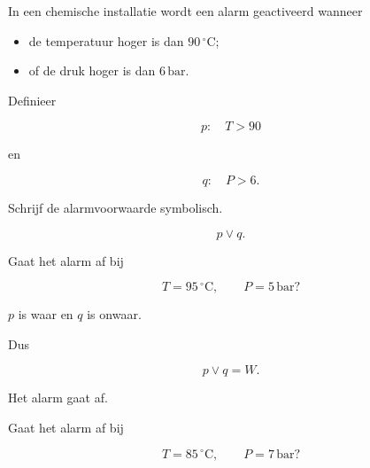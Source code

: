 \documentclass{ximera}
\begin{document}
\begin{oefening}{\oefU \ESS}

In een chemische installatie wordt een alarm geactiveerd wanneer

\begin{itemize}

  \item de temperatuur hoger is dan $90\,{}^\circ\mathrm C$;

  \item of de druk hoger is dan $6\,\mathrm{bar}$.

\end{itemize}

Definieer

\[
p:\quad T>90
\]

en

\[
q:\quad P>6.
\]

\begin{question}

Schrijf de alarmvoorwaarde symbolisch.

\begin{oplossing}

\[
p\lor q.
\]

\end{oplossing}

\end{question}



\begin{question}

Gaat het alarm af bij

\[
T=95\,{}^\circ\mathrm C,
\qquad
P=5\,\mathrm{bar}?
\]

\begin{oplossing}

$p$ is waar en $q$ is onwaar.

Dus

\[
p\lor q=W.
\]

Het alarm gaat af.

\end{oplossing}

\end{question}



\begin{question}

Gaat het alarm af bij

\[
T=85\,{}^\circ\mathrm C,
\qquad
P=7\,\mathrm{bar}?
\]

\begin{oplossing}


\end{oplossing}
\end{question}
\end{oefening}
\end{document}
